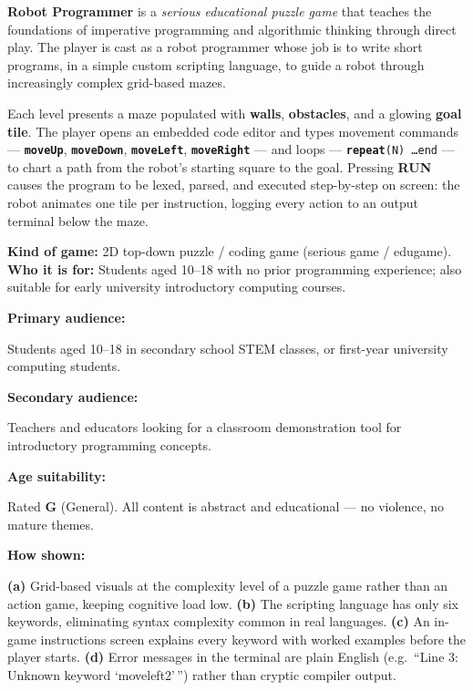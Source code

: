 \documentclass[12pt,a4paper]{article}
\newcommand{\keyword}[1]{\textcolor{keyword}{\texttt{\bfseries #1}}}
\newcommand{\gddfield}[2]{%
  \noindent\begin{minipage}[t]{3.5cm}\bfseries\color{accent}\sffamily#1\end{minipage}%
  \hspace{8pt}%
  \begin{minipage}[t]{\dimexpr\linewidth-3.5cm-8pt\relax}%
    #2
  \end{minipage}\par\smallskip}
\begin{document}
\begin{tcolorbox}[gddbox, title={Game Description}]
\textbf{Robot Programmer} is a \emph{serious educational puzzle game} that teaches the foundations of imperative programming and algorithmic thinking through direct play. The player is cast as a robot programmer whose job is to write short programs, in a simple custom scripting language, to guide a robot through increasingly complex grid-based mazes.

\vspace{6pt}
Each level presents a maze populated with \textbf{walls}, \textbf{obstacles}, and a glowing \textbf{goal tile}. The player opens an embedded code editor and types movement commands — \keyword{moveUp}, \keyword{moveDown}, \keyword{moveLeft}, \keyword{moveRight} — and loops — \keyword{repeat}\texttt{(N) \ldots end} — to chart a path from the robot's starting square to the goal. Pressing \textbf{RUN} causes the program to be lexed, parsed, and executed step-by-step on screen: the robot animates one tile per instruction, logging every action to an output terminal below the maze.

\vspace{6pt}
\textbf{Kind of game:} 2D top-down puzzle / coding game (serious game / edugame).\\
\textbf{Who it is for:} Students aged 10--18 with no prior programming experience; also suitable for early university introductory computing courses.
\end{tcolorbox}

\vspace{6pt}

\begin{tcolorbox}[gddbox, title={Audience}]
\gddfield{Primary audience:}{Students aged 10--18 in secondary school STEM classes, or first-year university computing students.}
\gddfield{Secondary audience:}{Teachers and educators looking for a classroom demonstration tool for introductory programming concepts.}
\gddfield{Age suitability:}{Rated \textbf{G} (General). All content is abstract and educational — no violence, no mature themes.}
\gddfield{How shown:}{%
  \textbf{(a)} Grid-based visuals at the complexity level of a puzzle game rather than an action game, keeping cognitive load low.
  \textbf{(b)} The scripting language has only six keywords, eliminating syntax complexity common in real languages.
  \textbf{(c)} An in-game instructions screen explains every keyword with worked examples before the player starts.
  \textbf{(d)} Error messages in the terminal are plain English (e.g.\ ``Line 3: Unknown keyword `moveleft2'\,'') rather than cryptic compiler output.
}
\end{tcolorbox}
\end{document}
